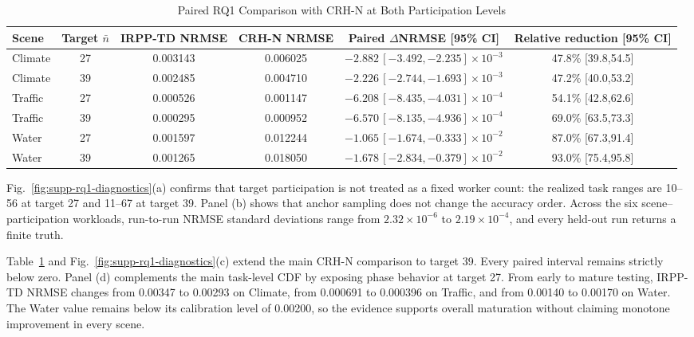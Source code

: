 \documentclass[journal]{IEEEtran}
\begin{document}
\begin{table}[!t]
\centering
\caption{Paired RQ1 Comparison with CRH-N at Both Participation Levels}
\label{tab:supp-rq1-paired}
\scriptsize
\setlength{\tabcolsep}{4.2pt}
\renewcommand{\arraystretch}{1.02}
\begin{tabular}{lccccc}
\toprule
Scene & Target $\bar n$ & IRPP-TD NRMSE & CRH-N NRMSE &
Paired $\Delta$NRMSE [95\% CI] & Relative reduction [95\% CI] \\
\midrule
Climate & 27 & 0.003143 & 0.006025 &
$-2.882\,[-3.492,-2.235]\times10^{-3}$ & 47.8\% [39.8,54.5] \\
Climate & 39 & 0.002485 & 0.004710 &
$-2.226\,[-2.744,-1.693]\times10^{-3}$ & 47.2\% [40.0,53.2] \\
Traffic & 27 & 0.000526 & 0.001147 &
$-6.208\,[-8.435,-4.031]\times10^{-4}$ & 54.1\% [42.8,62.6] \\
Traffic & 39 & 0.000295 & 0.000952 &
$-6.570\,[-8.135,-4.936]\times10^{-4}$ & 69.0\% [63.5,73.3] \\
Water & 27 & 0.001597 & 0.012244 &
$-1.065\,[-1.674,-0.333]\times10^{-2}$ & 87.0\% [67.3,91.4] \\
Water & 39 & 0.001265 & 0.018050 &
$-1.678\,[-2.834,-0.379]\times10^{-2}$ & 93.0\% [75.4,95.8] \\
\bottomrule
\end{tabular}
\end{table}

Fig.~\ref{fig:supp-rq1-diagnostics}(a) confirms that target participation is
not treated as a fixed worker count: the realized task ranges are 10--56 at
target 27 and 11--67 at target 39. Panel (b) shows that anchor sampling does not
change the accuracy order. Across the six scene--participation workloads,
run-to-run NRMSE standard deviations range from $2.32\times10^{-6}$ to
$2.19\times10^{-4}$, and every held-out run returns a finite truth.

Table~\ref{tab:supp-rq1-paired} and Fig.~\ref{fig:supp-rq1-diagnostics}(c)
extend the main CRH-N comparison to target 39. Every paired interval remains
strictly below zero. Panel (d) complements the main task-level CDF by exposing
phase behavior at target 27. From early to mature testing, IRPP-TD NRMSE changes
from 0.00347 to 0.00293 on Climate, from 0.000691 to 0.000396 on Traffic, and
from 0.00140 to 0.00170 on Water. The Water value remains below its calibration
level of 0.00200, so the evidence supports overall maturation without claiming
monotone improvement in every scene.
\end{document}
